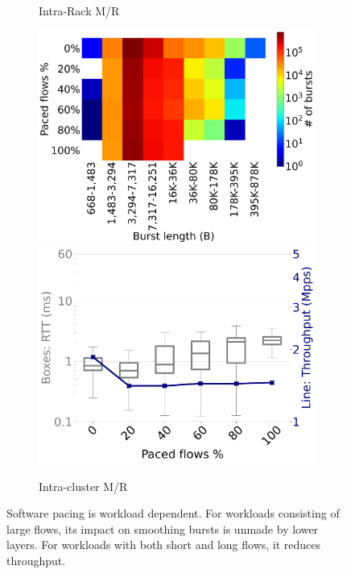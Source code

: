 \begin{figure}
\begin{subfigure}[t]{0.40\linewidth}
    \caption{Intra-Rack M/R}
	\label{fig:pacing_rack}
\end{subfigure}
\begin{subfigure}[t]{0.40\linewidth}
    \centering
    	\includegraphics[width=1\linewidth]{figs/pacing2.pdf}
    	\includegraphics[width=1\linewidth]{figs/pacing_intra_cluster_rtt_tput.pdf}
    \caption{Intra-cluster M/R}
	\label{fig:pacing_cluster}
\end{subfigure}
    \caption{\small{Software pacing is workload dependent. For workloads consisting of large flows, its impact on smoothing bursts is unmade by lower layers. For workloads with both short and long flows, it reduces throughput.}}
    \vspace{-2mm}
	\label{fig:pacing}
\end{figure}

